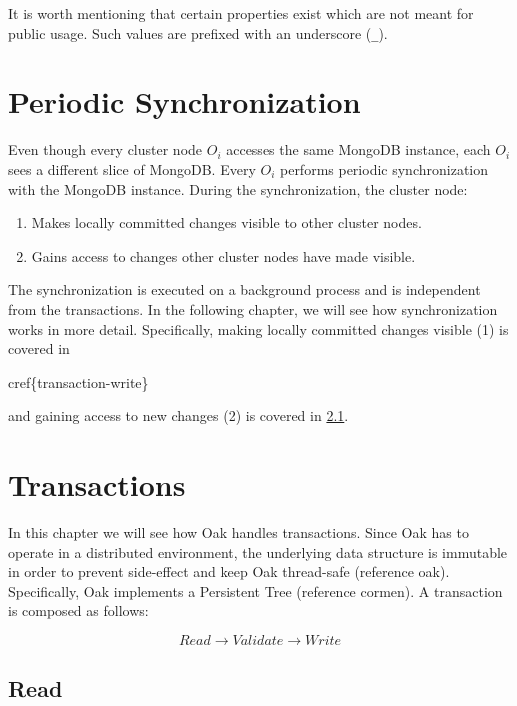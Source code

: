 \documentclass[abstracton,12pt]{scrreprt}
\begin{document}
It is worth mentioning that certain properties exist which are not meant for public usage.
Such values are prefixed with an underscore (\texttt{\_}).

\section{Periodic Synchronization}

Even though every cluster node $O_i$ accesses the same MongoDB instance,
each $O_i$ sees a different slice of MongoDB.
Every $O_i$ performs periodic synchronization with the MongoDB instance.
During the synchronization, the cluster node:
\begin{enumerate}
    \item Makes locally committed changes visible to other cluster nodes.
    \item Gains access to changes other cluster nodes have made visible.
\end{enumerate}

The synchronization is executed on a background process and is independent from the transactions.
In the following chapter, we will see how synchronization works in more detail.
Specifically, making locally committed changes visible (1) is covered in {\huge{cref\{transaction-write\}}\par} and
gaining access to new changes (2) is covered in \cref{transaction-read}.

\section{Transactions}

In this chapter we will see how Oak handles transactions.
Since Oak has to operate in a distributed environment, the underlying data structure is immutable in order to prevent side-effect and keep Oak thread-safe (reference oak).
Specifically, Oak implements a Persistent Tree (reference cormen).
A transaction is composed as follows:

$$
Read \longrightarrow Validate \longrightarrow Write
$$

\subsection{Read} \label{transaction-read}
\end{document}
